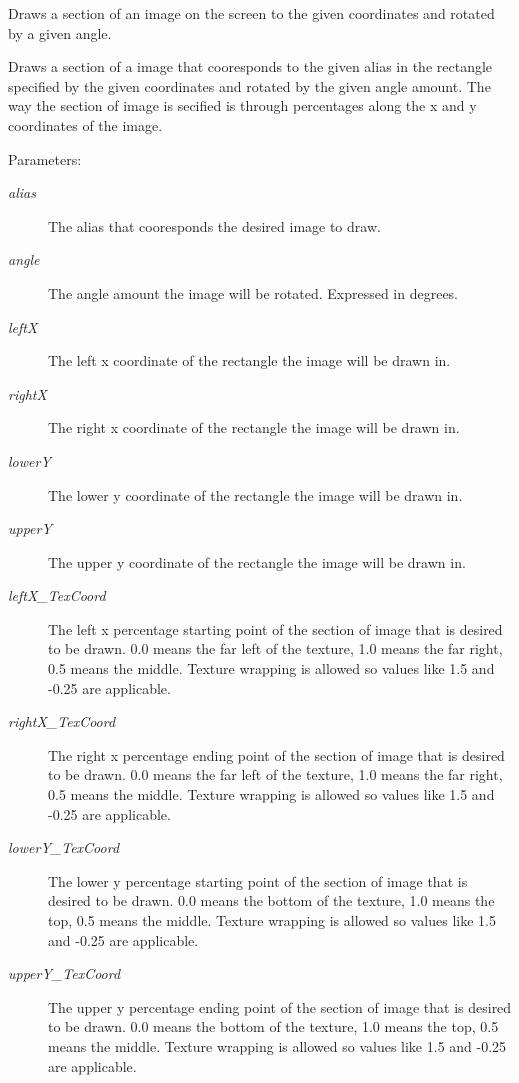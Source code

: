Draws a section of an image on the screen to the given coordinates and rotated by a given angle. 

Draws a section of a image that cooresponds to the given alias in the rectangle specified by the given coordinates and rotated by the given angle amount. The way the section of image is secified is through percentages along the x and y coordinates of the image. \begin{Desc}
\item[Parameters:]
\begin{description}
\item[{\em alias}]The alias that cooresponds the desired image to draw. \item[{\em angle}]The angle amount the image will be rotated. Expressed in degrees. \item[{\em leftX}]The left x coordinate of the rectangle the image will be drawn in. \item[{\em rightX}]The right x coordinate of the rectangle the image will be drawn in. \item[{\em lowerY}]The lower y coordinate of the rectangle the image will be drawn in. \item[{\em upperY}]The upper y coordinate of the rectangle the image will be drawn in. \item[{\em leftX\_\-TexCoord}]The left x percentage starting point of the section of image that is desired to be drawn. 0.0 means the far left of the texture, 1.0 means the far right, 0.5 means the middle. Texture wrapping is allowed so values like 1.5 and -0.25 are applicable. \item[{\em rightX\_\-TexCoord}]The right x percentage ending point of the section of image that is desired to be drawn. 0.0 means the far left of the texture, 1.0 means the far right, 0.5 means the middle. Texture wrapping is allowed so values like 1.5 and -0.25 are applicable. \item[{\em lowerY\_\-TexCoord}]The lower y percentage starting point of the section of image that is desired to be drawn. 0.0 means the bottom of the texture, 1.0 means the top, 0.5 means the middle. Texture wrapping is allowed so values like 1.5 and -0.25 are applicable. \item[{\em upperY\_\-TexCoord}]The upper y percentage ending point of the section of image that is desired to be drawn. 0.0 means the bottom of the texture, 1.0 means the top, 0.5 means the middle. Texture wrapping is allowed so values like 1.5 and -0.25 are applicable. \end{description}
\end{Desc}
